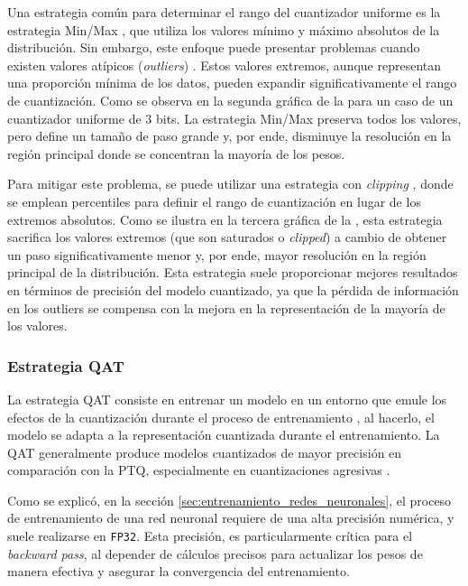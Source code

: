 Una estrategia común para determinar el rango del cuantizador uniforme es la estrategia Min/Max \cite{nagel2019datafree}, que utiliza los valores mínimo y máximo absolutos de la distribución. Sin embargo, este enfoque puede presentar problemas cuando existen valores atípicos (\textit{outliers}) \cite{banner2019posttraining4bitquantizationconvolution}. Estos valores extremos, aunque representan una proporción mínima de los datos, pueden expandir significativamente el rango de cuantización. Como se observa en la segunda gráfica de la  para un caso de un cuantizador uniforme de 3 bits. La estrategia Min/Max preserva todos los valores, pero define un tamaño de paso grande y, por ende, disminuye la resolución en la región principal donde se concentran la mayoría de los pesos.

Para mitigar este problema, se puede utilizar una estrategia con \textit{clipping} \cite{choukroun2019low}, donde se emplean percentiles para definir el rango de cuantización en lugar de los extremos absolutos. Como se ilustra en la tercera gráfica de la , esta estrategia sacrifica los valores extremos (que son saturados o \textit{clipped}) a cambio de obtener un paso significativamente menor y, por ende, mayor resolución en la región principal de la distribución. Esta estrategia suele proporcionar mejores resultados en términos de precisión del modelo cuantizado, ya que la pérdida de información en los outliers se compensa con la mejora en la representación de la mayoría de los valores.


\subsubsection{Estrategia QAT}
\label{sec:qat}
La estrategia QAT consiste en entrenar un modelo en un entorno que emule los efectos de la cuantización durante el proceso de entrenamiento \cite{Jacob2018}, al hacerlo, el modelo se adapta a la representación cuantizada durante el entrenamiento. La QAT generalmente produce modelos cuantizados de mayor precisión en comparación con la PTQ, especialmente en cuantizaciones agresivas \cite{dai2024trainablefixedpointquantizationdeep}.

Como se explicó, en la sección \ref{sec:entrenamiento_redes_neuronales}, el proceso de entrenamiento de una red neuronal requiere de una alta precisión numérica, y suele realizarse en \texttt{FP32}. Esta precisión, es particularmente crítica para el \textit{backward pass}, al depender de cálculos precisos para actualizar los pesos de manera efectiva y asegurar la convergencia del entrenamiento.

